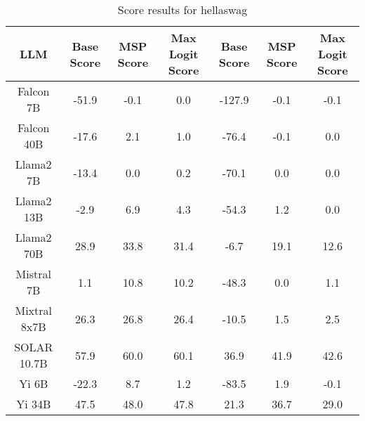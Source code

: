 \renewcommand\arraystretch{1.2}
\begin{table*}
\centering
\begin{tabular}{c|c|c|c|c|c|c}
LLM & Base Score & MSP Score & Max Logit Score & Base Score & MSP Score & Max Logit Score\\ \hline
Falcon 7B & -51.9 & -0.1 & 0.0 & -127.9 & -0.1 & -0.1\\
Falcon 40B & -17.6 & 2.1 & 1.0 & -76.4 & -0.1 & 0.0\\
Llama2 7B & -13.4 & 0.0 & 0.2 & -70.1 & 0.0 & 0.0\\
Llama2 13B & -2.9 & 6.9 & 4.3 & -54.3 & 1.2 & 0.0\\
Llama2 70B & 28.9 & 33.8 & 31.4 & -6.7 & 19.1 & 12.6\\
Mistral 7B & 1.1 & 10.8 & 10.2 & -48.3 & 0.0 & 1.1\\
Mixtral 8x7B & 26.3 & 26.8 & 26.4 & -10.5 & 1.5 & 2.5\\
SOLAR 10.7B & 57.9 & 60.0 & 60.1 & 36.9 & 41.9 & 42.6\\
Yi 6B & -22.3 & 8.7 & 1.2 & -83.5 & 1.9 & -0.1\\
Yi 34B & 47.5 & 48.0 & 47.8 & 21.3 & 36.7 & 29.0\\
\hline
\end{tabular}
\caption{Score results for hellaswag}
\end{table*}
\label{tab:hellaswag_score}
